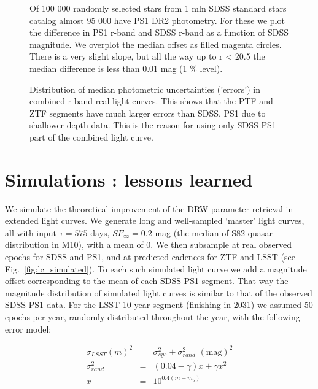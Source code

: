 \documentclass[twocolumn]{aastex62}
\begin{document}
\begin{figure}%
\caption{Of 100 000 randomly selected stars from 1 mln SDSS standard stars catalog almost 95 000 have PS1 DR2 photometry. For these we plot the difference in PS1 r-band and SDSS r-band as a function of SDSS magnitude. We overplot the median offset as filled magenta circles. There is a very slight slope, but all the way up to r < 20.5 the median difference is less than 0.01 mag (1 \% level).   }
\label{fig:offsetPS1mag}
\end{figure} 




\begin{figure}%
\caption{Distribution of median photometric uncertainties ('errors') in combined r-band real light curves. This shows that the PTF and ZTF segments have much larger errors than SDSS, PS1 due to shallower depth data. This is the reason for using only SDSS-PS1 part of the combined light curve.}
\label{fig:lc_errors}
\end{figure} 

%
%
%
%
%

\section{Simulations : lessons learned}\label{sec:simulation}

We simulate the theoretical improvement of the DRW parameter retrieval in extended light curves. We generate long and well-sampled  `master' light curves, all with input $\tau = 575 $ days, $SF_{\infty} = 0.2$ mag (the median of S82 quasar distribution in M10), with a mean of 0.  We then subsample at real observed epochs for SDSS and PS1, and at predicted cadences for ZTF and LSST  (see Fig.~\ref{fig:lc_simulated}). To each such simulated light curve we add a magnitude offset corresponding to the mean of each SDSS-PS1 segment. That way the magnitude distribution of simulated light curves is similar to that of the observed SDSS-PS1 data. For the LSST 10-year segment (finishing in 2031) we assumed 50 epochs per year, randomly distributed throughout the year, with the following error model:

\begin{eqnarray}
\label{eq:errorModel}
\sigma_{LSST}(m)^{2} &=& \sigma_{sys}^{2} + \sigma_{rand}^{2} \,\, \mathrm{(mag)}^{2} \\
\sigma_{rand}^{2} &=& (0.04-\gamma)x + \gamma x^{2} \nonumber \\
x &=& 10^{0.4(m-m_{5})} \nonumber
\end{eqnarray}
\end{document}

